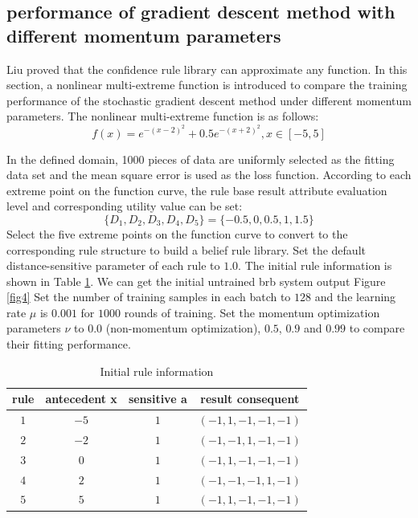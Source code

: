 \documentclass{ieeeaccess}
\begin{document}
\subsection{performance of gradient descent method with different momentum parameters}
Liu\cite{a16} proved that the confidence rule library can approximate any function.
In this section, a nonlinear multi-extreme function is introduced to compare the training performance of the stochastic gradient descent method under different momentum parameters.
The nonlinear multi-extreme function is as follows:
\begin{equation}
    f(x)=e^{-(x-2)^2}+0.5e^{-(x+2)^2},x\in[-5,5]
\end{equation}

In the defined domain, 1000 pieces of data are uniformly selected as the fitting data set and the mean square error is used as the loss function.
According to each extreme point on the function curve, the rule base result attribute evaluation level and corresponding utility value can be set:
$$\{D_1,D_2,D_3,D_4,D_5\}=\{-0.5,0,0.5,1,1.5\}$$
Select the five extreme points on the function curve to convert to the corresponding rule structure to build a belief rule library.
Set the default distance-sensitive parameter of each rule to $1.0$.
The initial rule information is shown in Table \ref{tab1}.
We can get the initial untrained brb system output Figure \ref{fig4}
Set the number of training samples in each batch to $128$ and the learning rate $\mu$ is $0.001$ for $1000$ rounds of training.
Set the momentum optimization parameters $\nu$ to 0.0 (non-momentum optimization), $0.5$, $0.9$ and $0.99$ to compare their fitting performance.

\begin{table}
    \caption{Initial rule information}
    \centering
    \label{tab1}
    \begin{tabular}{cccc}
        \hline
        rule & antecedent x & sensitive a & result consequent     \\
        \hline
        $1$  & $-5$         & $1$         & $(-1, 1, -1, -1, -1)$ \\
        $2$  & $-2$         & $1$         & $(-1, -1, 1, -1, -1)$ \\
        $3$  & $0$          & $1$         & $(-1, 1, -1, -1, -1)$ \\
        $4$  & $2$          & $1$         & $(-1, -1, -1, 1, -1)$ \\
        $5$  & $5$          & $1$         & $(-1, 1, -1, -1, -1)$ \\
        \hline
    \end{tabular}
\end{table}
\end{document}
